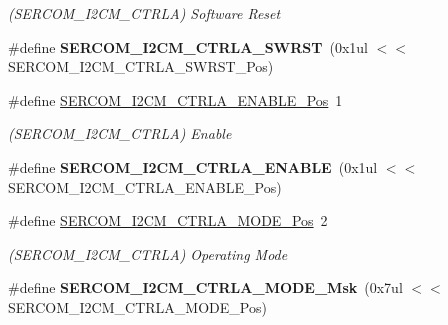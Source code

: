 \begin{DoxyCompactItemize}
\begin{DoxyCompactList}\small\item\em (S\+E\+R\+C\+O\+M\+\_\+\+I2\+C\+M\+\_\+\+C\+T\+R\+L\+A) Software Reset \end{DoxyCompactList}\item 
\hypertarget{group___s_a_m_l21___s_e_r_c_o_m_ga0e7f4d6cf8173caf7ada8cbb699f01c1}{}\#define {\bfseries S\+E\+R\+C\+O\+M\+\_\+\+I2\+C\+M\+\_\+\+C\+T\+R\+L\+A\+\_\+\+S\+W\+R\+S\+T}~(0x1ul $<$$<$ S\+E\+R\+C\+O\+M\+\_\+\+I2\+C\+M\+\_\+\+C\+T\+R\+L\+A\+\_\+\+S\+W\+R\+S\+T\+\_\+\+Pos)\label{group___s_a_m_l21___s_e_r_c_o_m_ga0e7f4d6cf8173caf7ada8cbb699f01c1}

\item 
\hypertarget{group___s_a_m_l21___s_e_r_c_o_m_ga77940e272336b631b01356a9e315a17d}{}\#define \hyperlink{group___s_a_m_l21___s_e_r_c_o_m_ga77940e272336b631b01356a9e315a17d}{S\+E\+R\+C\+O\+M\+\_\+\+I2\+C\+M\+\_\+\+C\+T\+R\+L\+A\+\_\+\+E\+N\+A\+B\+L\+E\+\_\+\+Pos}~1\label{group___s_a_m_l21___s_e_r_c_o_m_ga77940e272336b631b01356a9e315a17d}

\begin{DoxyCompactList}\small\item\em (S\+E\+R\+C\+O\+M\+\_\+\+I2\+C\+M\+\_\+\+C\+T\+R\+L\+A) Enable \end{DoxyCompactList}\item 
\hypertarget{group___s_a_m_l21___s_e_r_c_o_m_gaa701965181bb2c0b3f8fd90ffb02d0d6}{}\#define {\bfseries S\+E\+R\+C\+O\+M\+\_\+\+I2\+C\+M\+\_\+\+C\+T\+R\+L\+A\+\_\+\+E\+N\+A\+B\+L\+E}~(0x1ul $<$$<$ S\+E\+R\+C\+O\+M\+\_\+\+I2\+C\+M\+\_\+\+C\+T\+R\+L\+A\+\_\+\+E\+N\+A\+B\+L\+E\+\_\+\+Pos)\label{group___s_a_m_l21___s_e_r_c_o_m_gaa701965181bb2c0b3f8fd90ffb02d0d6}

\item 
\hypertarget{group___s_a_m_l21___s_e_r_c_o_m_gaa8f5b3c26e3c756262d48982291c7cce}{}\#define \hyperlink{group___s_a_m_l21___s_e_r_c_o_m_gaa8f5b3c26e3c756262d48982291c7cce}{S\+E\+R\+C\+O\+M\+\_\+\+I2\+C\+M\+\_\+\+C\+T\+R\+L\+A\+\_\+\+M\+O\+D\+E\+\_\+\+Pos}~2\label{group___s_a_m_l21___s_e_r_c_o_m_gaa8f5b3c26e3c756262d48982291c7cce}

\begin{DoxyCompactList}\small\item\em (S\+E\+R\+C\+O\+M\+\_\+\+I2\+C\+M\+\_\+\+C\+T\+R\+L\+A) Operating Mode \end{DoxyCompactList}\item 
\hypertarget{group___s_a_m_l21___s_e_r_c_o_m_ga592bdd1e0ecfb0e7f72eceddbe5da41c}{}\#define {\bfseries S\+E\+R\+C\+O\+M\+\_\+\+I2\+C\+M\+\_\+\+C\+T\+R\+L\+A\+\_\+\+M\+O\+D\+E\+\_\+\+Msk}~(0x7ul $<$$<$ S\+E\+R\+C\+O\+M\+\_\+\+I2\+C\+M\+\_\+\+C\+T\+R\+L\+A\+\_\+\+M\+O\+D\+E\+\_\+\+Pos)\label{group___s_a_m_l21___s_e_r_c_o_m_ga592bdd1e0ecfb0e7f72eceddbe5da41c}


\end{DoxyCompactItemize}
